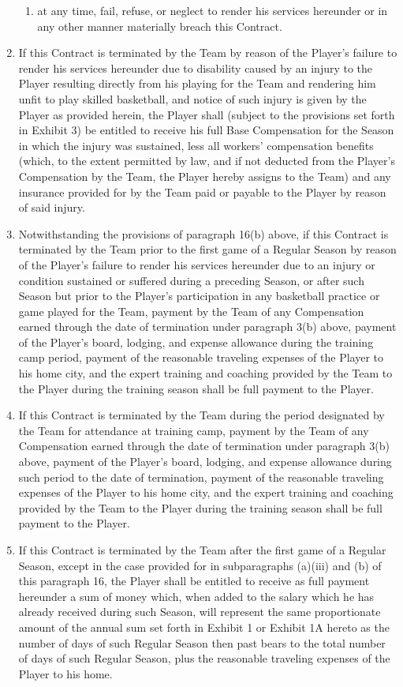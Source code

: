 \documentclass[
]{book}
\begin{document}
\begin{enumerate}
\begin{enumerate}
  \item
    at any time, fail, refuse, or neglect to render his services hereunder or in any other manner materially breach this Contract.
  \end{enumerate}
\item
  If this Contract is terminated by the Team by reason of the Player's failure to render his services hereunder due to disability caused by an injury to the Player resulting directly from his playing for the Team and rendering him unfit to play skilled basketball, and notice of such injury is given by the Player as provided herein, the Player shall (subject to the provisions set forth in Exhibit 3) be entitled to receive his full Base Compensation for the Season in which the injury was sustained, less all workers' compensation benefits (which, to the extent permitted by law, and if not deducted from the Player's Compensation by the Team, the Player hereby assigns to the Team) and any insurance provided for by the Team paid or payable to the Player by reason of said injury.
\item
  Notwithstanding the provisions of paragraph 16(b) above, if this Contract is terminated by the Team prior to the first game of a Regular Season by reason of the Player's failure to render his services hereunder due to an injury or condition sustained or suffered during a preceding Season, or after such Season but prior to the Player's participation in any basketball practice or game played for the Team, payment by the Team of any Compensation earned through the date of termination under paragraph 3(b) above, payment of the Player's board, lodging, and expense allowance during the training camp period, payment of the reasonable traveling expenses of the Player to his home city, and the expert training and coaching provided by the Team to the Player during the training season shall be full payment to the Player.
\item
  If this Contract is terminated by the Team during the period designated by the Team for attendance at training camp, payment by the Team of any Compensation earned through the date of termination under paragraph 3(b) above, payment of the Player's board, lodging, and expense allowance during such period to the date of termination, payment of the reasonable traveling expenses of the Player to his home city, and the expert training and coaching provided by the Team to the Player during the training season shall be full payment to the Player.
\item
  If this Contract is terminated by the Team after the first game of a Regular Season, except in the case provided for in subparagraphs (a)(iii) and (b) of this paragraph 16, the Player shall be entitled to receive as full payment hereunder a sum of money which, when added to the salary which he has already received during such Season, will represent the same proportionate amount of the annual sum set forth in Exhibit 1 or Exhibit 1A hereto as the number of days of such Regular Season then past bears to the total number of days of such Regular Season, plus the reasonable traveling expenses of the Player to his home.

\end{enumerate}
\end{document}

